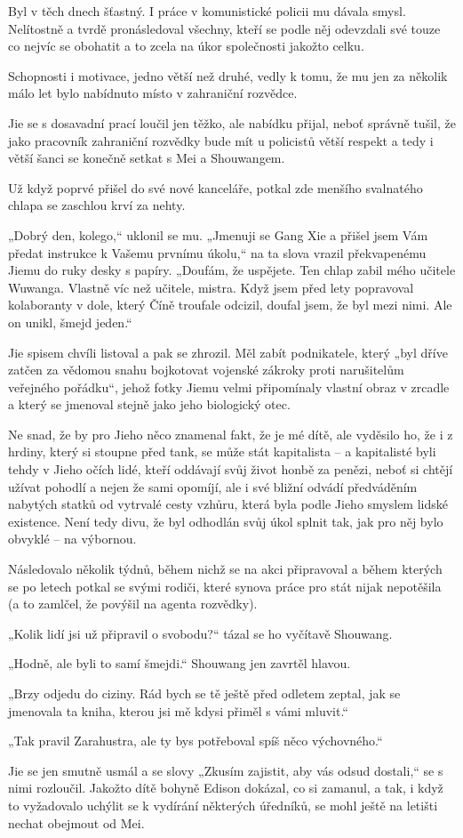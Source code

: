 Byl v těch dnech šťastný. I práce v komunistické policii mu dávala smysl. Nelítostně a tvrdě pronásledoval všechny, kteří se podle něj odevzdali své touze co nejvíc se obohatit a to zcela na úkor společnosti jakožto celku.

Schopnosti i motivace, jedno větší než druhé, vedly k tomu, že mu jen za několik málo let bylo nabídnuto místo v zahraniční rozvědce.

Jie se s dosavadní prací loučil jen těžko, ale nabídku přijal, neboť správně tušil, že jako pracovník zahraniční rozvědky bude mít u policistů větší respekt a tedy i větší šanci se konečně setkat s Mei a Shouwangem.
	
Už když poprvé přišel do své nové kanceláře, potkal zde menšího svalnatého chlapa se zaschlou krví za nehty.
	
„Dobrý den, kolego,“ uklonil se mu. „Jmenuji se Gang Xie a přišel jsem Vám předat instrukce k Vašemu prvnímu úkolu,“ na ta slova vrazil překvapenému Jiemu do ruky desky s papíry. „Doufám, že uspějete. Ten chlap zabil mého učitele Wuwanga. Vlastně víc než učitele, mistra. Když jsem před lety popravoval kolaboranty v dole, který Číně troufale odcizil, doufal jsem, že byl mezi nimi. Ale on unikl, šmejd jeden.“

Jie spisem chvíli listoval a pak se zhrozil. Měl zabít podnikatele, který „byl dříve zatčen za vědomou snahu bojkotovat vojenské zákroky proti narušitelům veřejného pořádku“, jehož fotky Jiemu velmi připomínaly vlastní obraz v zrcadle a který se jmenoval stejně jako jeho biologický otec.

Ne snad, že by pro Jieho  něco znamenal fakt, že je mé dítě, ale vyděsilo ho, že i z hrdiny, který si stoupne před tank, se může stát kapitalista – a kapitalisté byli tehdy v Jieho očích lidé, kteří oddávají svůj život honbě za penězi, neboť si chtějí užívat pohodlí a nejen že sami opomíjí, ale i své bližní odvádí předváděním nabytých statků od vytrvalé cesty vzhůru, která byla podle Jieho smyslem lidské existence. Není tedy divu, že byl odhodlán svůj úkol splnit tak, jak pro něj bylo obvyklé – na výbornou. 

Následovalo několik týdnů, během nichž se na akci připravoval a během kterých se po letech potkal se svými rodiči, které synova práce pro stát nijak nepotěšila (a to zamlčel, že povýšil na agenta rozvědky). 

„Kolik lidí jsi už připravil o svobodu?“ tázal se ho vyčítavě Shouwang.

„Hodně, ale byli to samí šmejdi.“ Shouwang jen zavrtěl hlavou.

„Brzy odjedu do ciziny. Rád bych se tě ještě před odletem zeptal, jak se jmenovala ta kniha, kterou jsi mě kdysi přiměl s vámi mluvit.“

„Tak pravil Zarahustra, ale ty bys potřeboval spíš něco výchovného.“

Jie se jen smutně usmál a se slovy „Zkusím zajistit, aby vás odsud dostali,“ se s nimi rozloučil. Jakožto dítě bohyně Edison dokázal, co si zamanul, a tak, i když to vyžadovalo uchýlit se k vydírání některých úředníků, se mohl ještě na letišti nechat obejmout od Mei.
